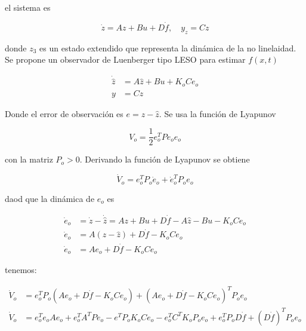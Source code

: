 el sistema es 

\begin{equation*}
    \dot{z} = Az + Bu + D\dot{f}, \quad y_z = Cz
\end{equation*}

donde \(z_3\) es un estado extendido que representa la dinámica de la no linelaidad.\\

Se propone un observador de Luenberger tipo LESO para estimar \(f(x,t)\)

\begin{equation*}
    \begin{aligned}
        \dot{\hat{z}} &= A\hat{z} + Bu + K_oCe_o\\
        y &= Cz
    \end{aligned}
\end{equation*}

Donde el error de observación es \(e=z-\hat{z}\). Se usa la función de Lyapunov 

\begin{equation*}
    V_o=\frac{1}{2}e_o^TPe_oe_o
\end{equation*}

con la matriz \(P_o>0\). Derivando la función de Lyapunov se obtiene

\begin{equation*}
    \dot{V}_o = e_o^TP_o\dot{e}_o + \dot{e}_o^TP_o e_o 
\end{equation*}

daod que la dinámica de \(e_o\) es

\begin{equation*}
    \begin{aligned}
        \dot{e}_o &= \dot{z} - \dot{\hat{z}} = Az + Bu + D\dot{f} - A\hat{z} - Bu - K_oCe_o \\
        \dot{e}_o &= A(z-\hat{z}) + D\dot{f} - K_oCe_o \\
        \dot{e}_o &= Ae_o + D\dot{f} - K_oCe_o
    \end{aligned}
\end{equation*}

tenemos:

\begin{equation*}
    \begin{aligned}
    \dot{V}_o &= e_o^TP_o(Ae_o + D\dot{f} - K_oCe_o) + (Ae_o + D\dot{f} - K_oCe_o)^TP_oe_o \\
    \dot{V}_o &= e_o^Te_oAe_o + e_o^TA^TPe_o-e^TP_oK_oCe_o - e_o^TC^TK_oP_oe_o + e_o^TP_oD\dot{f} + (D\dot{f})^TP_oe_o \\
\end{aligned}
\end{equation*}


